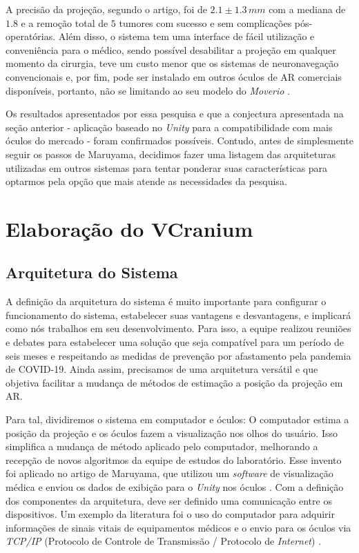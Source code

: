 A precisão da projeção, segundo o artigo, foi de \(2.1 \pm  1.3\,mm\) com a mediana de \(1.8\) e a remoção total de \(5\) tumores com sucesso e sem complicações pós-operatórias. Além disso, o sistema tem uma interface de fácil utilização e conveniência para o médico, sendo possível desabilitar a projeção em qualquer momento da cirurgia, teve um custo menor que os sistemas de neuronavegação convencionais e, por fim, pode ser instalado em outros óculos de AR comerciais disponíveis, portanto, não se limitando ao seu modelo do \textit{Moverio} \cite{Maruyama2018}.

Os resultados apresentados por essa pesquisa e que a conjectura apresentada na seção anterior - aplicação baseado no \textit{Unity} para a compatibilidade com mais óculos do mercado - foram confirmados possíveis. Contudo, antes de simplesmente seguir os passos de Maruyama, decidimos fazer uma listagem das arquiteturas utilizadas em outros sistemas para tentar ponderar suas características para optarmos pela opção que mais atende as necessidades da pesquisa.

\section{Elaboração do VCranium}\label{chp:criacao-vcranium} 

\subsection{Arquitetura do Sistema}

A definição da arquitetura do sistema é muito importante para configurar o funcionamento do sistema, estabelecer suas vantagens e desvantagens, e implicará como nós trabalhos em seu desenvolvimento. Para isso, a equipe realizou reuniões e debates para estabelecer uma solução que seja compatível para um período de seis meses e respeitando as medidas de prevenção por afastamento pela pandemia de COVID-19. Ainda assim, precisamos de uma arquitetura versátil e que objetiva facilitar a mudança de métodos de estimação a posição da projeção em AR. 

Para tal, dividiremos o sistema em computador e óculos: O computador estima a posição da projeção e os óculos fazem a visualização nos olhos do usuário. Isso simplifica a mudança de método aplicado pelo computador, melhorando a recepção de novos algoritmos da equipe de estudos do laboratório. Esse invento foi aplicado no artigo de Maruyama, que utilizou um \textit{software} de visualização médica e enviou os dados de exibição para o \textit{Unity} nos óculos \cite{Maruyama2018}. Com a definição dos componentes da arquitetura, deve ser definido uma comunicação entre os dispositivos. Um exemplo da literatura foi o uso do computador para adquirir informações de sinais vitais de equipamentos médicos e o envio para os óculos via \textit{TCP/IP} (Protocolo de Controle de Transmissão / Protocolo de \textit{Internet}) \cite{Arpaia2021}.

